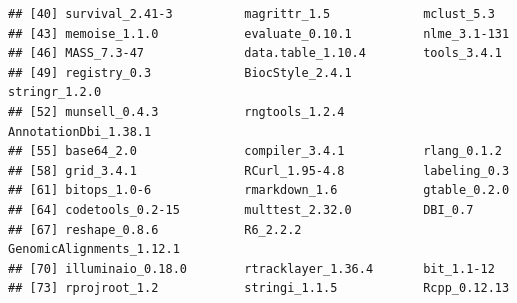 \documentclass{article}\usepackage[]{graphicx}\usepackage[usenames,dvipsnames]{color}
\makeatletter
\newenvironment{kframe}{%
 \def\at@end@of@kframe{}%
 \ifinner\ifhmode%
  \def\at@end@of@kframe{\end{minipage}}%
  \begin{minipage}{\columnwidth}%
 \fi\fi%
 \def\FrameCommand##1{\hskip\@totalleftmargin \hskip-\fboxsep
 \colorbox{shadecolor}{##1}\hskip-\fboxsep
     \hskip-\linewidth \hskip-\@totalleftmargin \hskip\columnwidth}%
 \MakeFramed {\advance\hsize-\width
   \@totalleftmargin\z@ \linewidth\hsize
   \@setminipage}}%
 {\par\unskip\endMakeFramed%
 \at@end@of@kframe}
\newenvironment{knitrout}{}{} %
\makeatother
\begin{document}
\begin{knitrout}
\begin{kframe}
\begin{verbatim}
## [40] survival_2.41-3          magrittr_1.5             mclust_5.3              
## [43] memoise_1.1.0            evaluate_0.10.1          nlme_3.1-131            
## [46] MASS_7.3-47              data.table_1.10.4        tools_3.4.1             
## [49] registry_0.3             BiocStyle_2.4.1          stringr_1.2.0           
## [52] munsell_0.4.3            rngtools_1.2.4           AnnotationDbi_1.38.1    
## [55] base64_2.0               compiler_3.4.1           rlang_0.1.2             
## [58] grid_3.4.1               RCurl_1.95-4.8           labeling_0.3            
## [61] bitops_1.0-6             rmarkdown_1.6            gtable_0.2.0            
## [64] codetools_0.2-15         multtest_2.32.0          DBI_0.7                 
## [67] reshape_0.8.6            R6_2.2.2                 GenomicAlignments_1.12.1
## [70] illuminaio_0.18.0        rtracklayer_1.36.4       bit_1.1-12              
## [73] rprojroot_1.2            stringi_1.1.5            Rcpp_0.12.13
\end{verbatim}
\end{kframe}
\end{knitrout}



\end{document}
